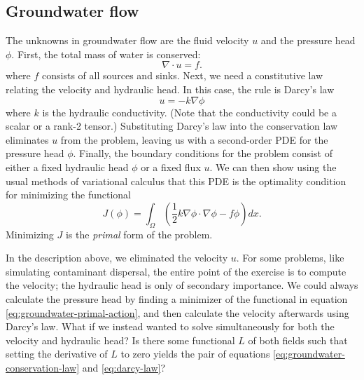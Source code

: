\documentclass{article}
\theoremstyle{definition}
\theoremstyle{plain}
\begin{document}
\subsection{Groundwater flow}

The unknowns in groundwater flow are the fluid velocity $u$ and the pressure head $\phi$.
First, the total mass of water is conserved:
\begin{equation}
    \nabla\cdot u = f.
    \label{eq:groundwater-conservation-law}
\end{equation}
where $f$ consists of all sources and sinks.
Next, we need a constitutive law relating the velocity and hydraulic head.
In this case, the rule is Darcy's law
\begin{equation}
    u = -k\nabla\phi
    \label{eq:darcy-law}
\end{equation}
where $k$ is the hydraulic conductivity.
(Note that the conductivity could be a scalar or a rank-2 tensor.)
Substituting Darcy's law into the conservation law eliminates $u$ from the problem, leaving us with a second-order PDE for the pressure head $\phi$.
Finally, the boundary conditions for the problem consist of either a fixed hydraulic head $\phi$ or a fixed flux $u$.
We can then show using the usual methods of variational calculus that this PDE is the optimality condition for minimizing the functional
\begin{equation}
    J(\phi) = \int_\Omega\left(\frac{1}{2}k\nabla\phi\cdot\nabla\phi - f\phi\right)dx.
    \label{eq:groundwater-primal-action}
\end{equation}
Minimizing $J$ is the \emph{primal} form of the problem.

In the description above, we eliminated the velocity $u$.
For some problems, like simulating contaminant dispersal, the entire point of the exercise is to compute the velocity; the hydraulic head is only of secondary importance.
We could always calculate the pressure head by finding a minimizer of the functional in equation \eqref{eq:groundwater-primal-action}, and then calculate the velocity afterwards using Darcy's law.
What if we instead wanted to solve simultaneously for both the velocity and hydraulic head?
Is there some functional $L$ of both fields such that setting the derivative of $L$ to zero yields the pair of equations \eqref{eq:groundwater-conservation-law} and \eqref{eq:darcy-law}?
\end{document}

